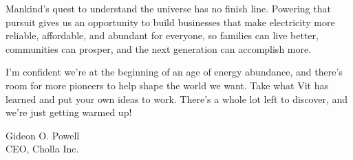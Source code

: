Mankind's quest to understand the universe has no finish line. Powering that pursuit gives us an opportunity to build businesses that make electricity more reliable, affordable, and abundant for everyone, so families can live better, communities can prosper, and the next generation can accomplish more.

I'm confident we're at the beginning of an age of energy abundance, and there's room for more pioneers to help shape the world we want. Take what Vit has learned and put your own ideas to work. There's a whole lot left to discover, and we're just getting warmed up!

\vspace{1em}
\noindent Gideon O. Powell \\
CEO, Cholla Inc.
